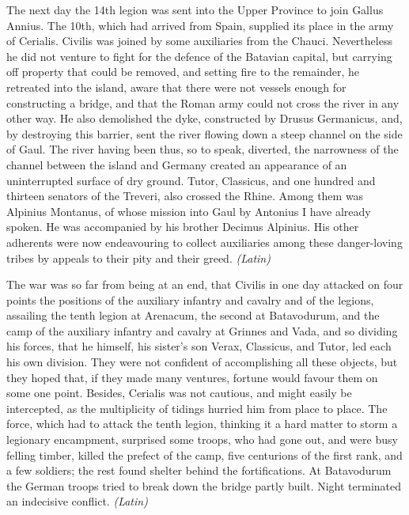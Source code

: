 
The next day the 14th legion was sent into the Upper Province to join Gallus Annius. The 10th, which had arrived from Spain, supplied its place in the army of Cerialis. Civilis was joined by some auxiliaries from the Chauci. Nevertheless he did not venture to fight for the defence of the Batavian capital, but carrying off property that could be removed, and setting fire to the remainder, he retreated into the island, aware that there were not vessels enough for constructing a bridge, and that the Roman army could not cross the river in any other way. He also demolished the dyke, constructed by Drusus Germanicus, and, by destroying this barrier, sent the river flowing down a steep channel on the side of Gaul. The river having been thus, so to speak, diverted, the narrowness of the channel between the island and Germany created an appearance of an uninterrupted surface of dry ground. Tutor, Classicus, and one hundred and thirteen senators of the Treveri, also crossed the Rhine. Among them was Alpinius Montanus, of whose mission into Gaul by Antonius I have already spoken. He was accompanied by his brother Decimus Alpinius. His other adherents were now endeavouring to collect auxiliaries among these danger-loving tribes by appeals to their pity and their greed. \emph{(Latin)}


The war was so far from being at an end, that Civilis in one day attacked on four points the positions of the auxiliary infantry and cavalry and of the legions, assailing the tenth legion at Arenacum, the second at Batavodurum, and the camp of the auxiliary infantry and cavalry at Grinnes and Vada, and so dividing his forces, that he himself, his sister's son Verax, Classicus, and Tutor, led each his own division. They were not confident of accomplishing all these objects, but they hoped that, if they made many ventures, fortune would favour them on some one point. Besides, Cerialis was not cautious, and might easily be intercepted, as the multiplicity of tidings hurried him from place to place. The force, which had to attack the tenth legion, thinking it a hard matter to storm a legionary encampment, surprised some troops, who had gone out, and were busy felling timber, killed the prefect of the camp, five centurions of the first rank, and a few soldiers; the rest found shelter behind the fortifications. At Batavodurum the German troops tried to break down the bridge partly built. Night terminated an indecisive conflict. \emph{(Latin)}

